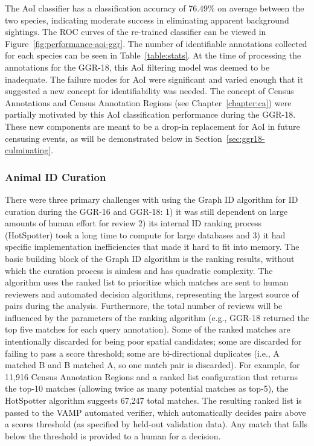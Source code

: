 The AoI classifier has a classification accuracy of 76.49\% on average between the two species, indicating moderate success in eliminating apparent background sightings.  The ROC curves of the re-trained classifier can be viewed in Figure~\ref{fig:performance-aoi-ggr}.  The number of identifiable annotations collected for each species can be seen in Table~\ref{table:stats}.  At the time of processing the annotations for the GGR-18, this AoI filtering model was deemed to be inadequate.  The failure modes for AoI were significant and varied enough that it suggested a new concept for identifiability was needed.  The concept of Census Annotations and Census Annotation Regions (see Chapter~\ref{chapter:ca}) were partially motivated by this AoI classification performance during the GGR-18.  These new components are meant to be a drop-in replacement for AoI in future censusing events, as will be demonstrated below in Section~\ref{sec:ggr18-culminating}.

\subsubsection{Animal ID Curation}

There were three primary challenges with using the Graph ID algorithm for ID curation during the GGR-16 and GGR-18: 1) it was still dependent on large amounts of human effort for review 2) its internal ID ranking process (HotSpotter) took a long time to compute for large databases and 3) it had specific implementation inefficiencies that made it hard to fit into memory.  The basic building block of the Graph ID algorithm is the ranking results, without which the curation process is aimless and has quadratic complexity.  The algorithm uses the ranked list to prioritize which matches are sent to human reviewers and automated decision algorithms, representing the largest source of pairs during the analysis.  Furthermore, the total number of reviews will be influenced by the parameters of the ranking algorithm (e.g., GGR-18 returned the top five matches for each query annotation).  Some of the ranked matches are intentionally discarded for being poor spatial candidates; some are discarded for failing to pass a score threshold; some are bi-directional duplicates (i.e., A matched B and B matched A, so one match pair is discarded).  For example, for 11,916 Census Annotation Regions and a ranked list configuration that returns the top-10 matches (allowing twice as many potential matches as top-5), the HotSpotter algorithm suggests 67,247 total matches.  The resulting ranked list is passed to the VAMP automated verifier, which automatically decides pairs above a scores threshold (as specified by held-out validation data).  Any match that falls below the threshold is provided to a human for a decision.

